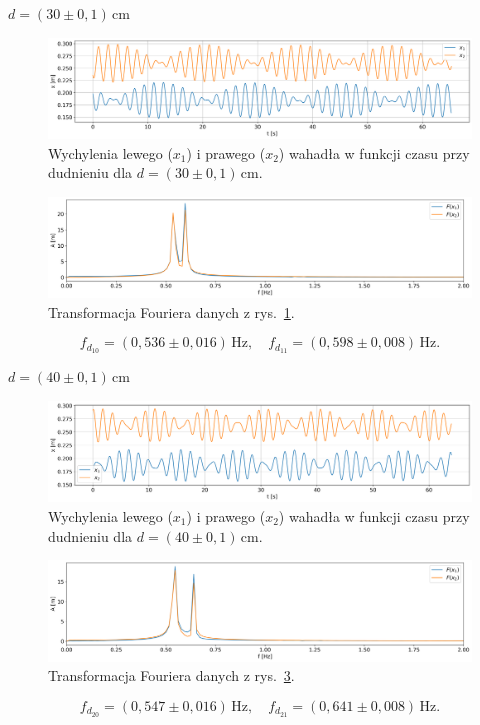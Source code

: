 \documentclass[12pt]{article}
\begin{document}
\(d = (30 \pm 0{,}1)\,\mathrm{cm}\)
\begin{figure}[H]
	\centering
	\includegraphics[width=\linewidth]{beats_1}
	\caption{Wychylenia lewego (\(x_1\)) i prawego (\(x_2\)) wahadła w funkcji czasu przy dudnieniu dla \(d = (30 \pm 0{,}1)\,\mathrm{cm}\).}
	\label{fig:beats_0}
\end{figure}
\begin{figure}[H]
	\centering
	\includegraphics[width=\linewidth]{beats_1_fft}
	\caption{Transformacja Fouriera danych z rys.~\ref{fig:beats_0}.}
	\label{fig:coutner_phase_0_fft}
\end{figure}
\[
	f_{d_{10}} = (0{,}536 \pm 0{,}016)\,\mathrm{Hz}, \quad
	f_{d_{11}} = (0{,}598 \pm 0{,}008)\,\mathrm{Hz}.
\]

\newpage

\(d = (40 \pm 0{,}1)\,\mathrm{cm}\)
\begin{figure}[H]
	\centering
	\includegraphics[width=\linewidth]{beats_2}
	\caption{Wychylenia lewego (\(x_1\)) i prawego (\(x_2\)) wahadła w funkcji czasu przy dudnieniu dla \(d = (40 \pm 0{,}1)\,\mathrm{cm}\).}
	\label{fig:beats_1}
\end{figure}
\begin{figure}[H]
	\centering
	\includegraphics[width=\linewidth]{beats_2_fft}
	\caption{Transformacja Fouriera danych z rys.~\ref{fig:beats_1}.}
	\label{fig:coutner_phase_1_fft}
\end{figure}
\[
	f_{d_{20}} = (0{,}547 \pm 0{,}016)\,\mathrm{Hz}, \quad
	f_{d_{21}} = (0{,}641 \pm 0{,}008)\,\mathrm{Hz}.
\]
\end{document}
